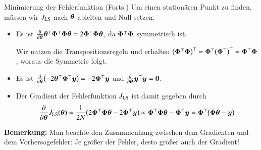 \begin{frame}{Minimierung der Fehlerfunktion (Forts.)}{}
	Um einen stationären Punkt zu finden, müssen wir $J_{\text{LS}}$ nach $\bm{\theta}$ ableiten und Null setzen.

	\begin{itemize}
		\item Es ist $\frac{\partial}{\partial \bm{\theta}} \bm{\theta}^\top \bm{\Phi}^\top \bm{\Phi} \bm{\theta} = 2 \bm{\Phi}^\top \bm{\Phi} \bm{\theta}$,
			da $\bm{\Phi}^\top \bm{\Phi}$ symmetrisch ist. \\ \vspace*{2mm}
		\begin{myproof}
			Wir nutzen die Transpositionsregeln und erhalten $\bigl( \bm{\Phi}^\top \bm{\Phi} \bigr)^\top =
			\bm{\Phi}^\top \bigl( \bm{\Phi}^\top \bigr)^\top = \bm{\Phi}^\top \bm{\Phi}$, woraus die Symmetrie folgt.
		\end{myproof} \vspace*{2mm}
		\item Es ist $\frac{\partial}{\partial \bm{\theta}} \bigl( -2 \bm{\theta}^\top \bm{\Phi}^\top \bm{y} \bigr) = -2 \bm{\Phi}^\top \bm{y}$
			und $\frac{\partial}{\partial \bm{\theta}} \bm{y}^\top \bm{y} = \bm{0}$.
		\item Der Gradient der Fehlerfunktion $J_{\text{LS}}$ ist damit gegeben durch
		\begin{equation*}
			\frac{\partial}{\partial \bm{\theta}} J_{\text{LS}}(\bm{\theta})
				= \frac{1}{2 N} \bigl( 2 \bm{\Phi}^\top \bm{\Phi} \bm{\theta} - 2 \bm{\Phi}^\top \bm{y} \bigr)
				\propto \bm{\Phi}^\top \bm{\Phi} \bm{\theta} - \bm{\Phi}^\top \bm{y}
				= \bm{\Phi}^\top \bigl( \bm{\Phi} \bm{\theta} - \bm{y} \bigr)
		\end{equation*}
	\end{itemize}
	
	\begin{boxGray}
		\textbf{Bemerkung:} Man beachte den Zusammenhang zwischen dem Gradienten und dem Vorhersagefehler:
		Je größer der Fehler, desto größer auch der Gradient!
	\end{boxGray}
\end{frame}


